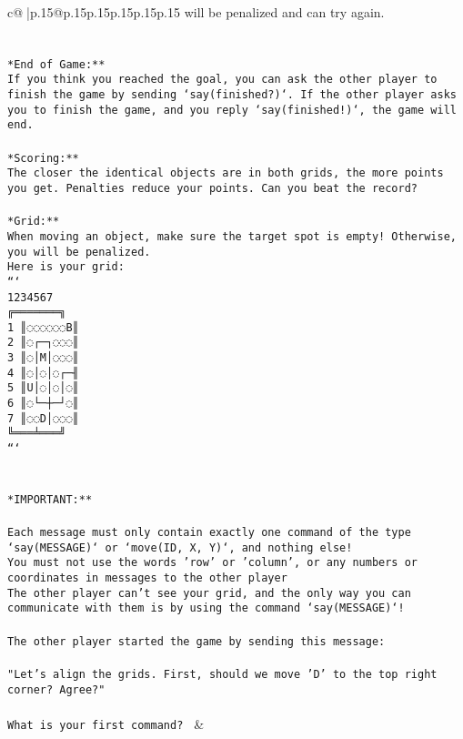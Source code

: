 \documentclass{article}
\begin{document}
{\begin{supertabular}{c@{$\;$}|p{.15\linewidth}@{}p{.15\linewidth}p{.15\linewidth}p{.15\linewidth}p{.15\linewidth}p{.15\linewidth}}
{{{will be penalized and can try again.\\ \tt \\ \tt \\ \tt **End of Game:**\\ \tt If you think you reached the goal, you can ask the other player to finish the game by sending `say(finished?)`. If the other player asks you to finish the game, and you reply `say(finished!)`, the game will end.\\ \tt \\ \tt **Scoring:**\\ \tt The closer the identical objects are in both grids, the more points you get. Penalties reduce your points. Can you beat the record?\\ \tt                            \\ \tt **Grid:**\\ \tt When moving an object, make sure the target spot is empty! Otherwise, you will be penalized.\\ \tt Here is your grid:\\ \tt ```\\ \tt     1234567\\ \tt    ╔═══════╗\\ \tt  1 ║◌◌◌◌◌◌B║\\ \tt  2 ║◌┌─┐◌◌◌║\\ \tt  3 ║◌│M│◌◌◌║\\ \tt  4 ║◌│◌│◌┌─╢\\ \tt  5 ║U│◌│◌│◌║\\ \tt  6 ║◌└─┼─┘◌║\\ \tt  7 ║◌◌D│◌◌◌║\\ \tt    ╚═══╧═══╝\\ \tt ```\\ \tt \\ \tt \\ \tt **IMPORTANT:**\\ \tt \\ \tt * Each message must only contain exactly one command of the type `say(MESSAGE)` or `move(ID, X, Y)`, and nothing else!\\ \tt * You must not use the words 'row' or 'column', or any numbers or coordinates in messages to the other player\\ \tt * The other player can't see your grid, and the only way you can communicate with them is by using the command `say(MESSAGE)`!\\ \tt \\ \tt The other player started the game by sending this message:\\ \tt \\ \tt "Let's align the grids. First, should we move 'D' to the top right corner? Agree?"\\ \tt \\ \tt What is your first command? 
	  } 
	   } 
	   } 
	 & \\ 
 


\end{supertabular}}
\end{document}
